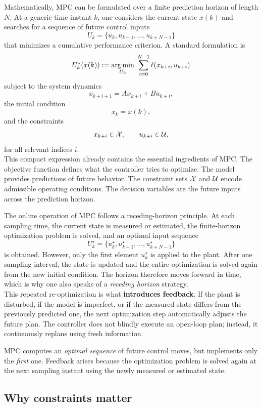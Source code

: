 Mathematically, MPC can be formulated over a finite prediction horizon of length $N$. At a generic time instant $k$, one considers the current state $x(k)$ and searches for a sequence of future control inputs
\[
U_k = \{u_k,u_{k+1},\dots,u_{k+N-1}\}
\]
that minimizes a cumulative performance criterion. A standard formulation is
\[
U_k^\star(x(k)) := \operatorname*{arg\,min}_{U_k}\; \sum_{i=0}^{N-1} \ell(x_{k+i},u_{k+i})
\]
subject to the system dynamics
\[
x_{k+i+1}=Ax_{k+i}+Bu_{k+i},
\]
the initial condition
\[
x_k = x(k),
\]
and the constraints
\[
x_{k+i}\in\mathcal{X},\qquad u_{k+i}\in\mathcal{U},
\]
for all relevant indices $i$.\\
This compact expression already contains the essential ingredients of MPC. The objective function defines what the controller tries to optimize. The model provides predictions of future behavior. The constraint sets $\mathcal{X}$ and $\mathcal{U}$ encode admissible operating conditions. The decision variables are the future inputs across the prediction horizon.

The online operation of MPC follows a receding-horizon principle. At each sampling time, the current state is measured or estimated, the finite-horizon optimization problem is solved, and an optimal input sequence
\[
U_k^\star = \{u_k^\star,u_{k+1}^\star,\dots,u_{k+N-1}^\star\}
\]
is obtained. However, only the first element $u_k^\star$ is applied to the plant. After one sampling interval, the state is updated and the entire optimization is solved again from the new initial condition. The horizon therefore moves forward in time, which is why one also speaks of a \emph{receding horizon} strategy.\\
This repeated re-optimization is what \textbf{introduces feedback}. If the plant is disturbed, if the model is imperfect, or if the measured state differs from the previously predicted one, the next optimization step automatically adjusts the future plan. The controller does not blindly execute an open-loop plan; instead, it continuously replans using fresh information.

\begin{theorembox}
MPC computes an \emph{optimal sequence} of future control moves, but implements only the \emph{first} one. Feedback arises because the optimization problem is solved again at the next sampling instant using the newly measured or estimated state.
\end{theorembox}

\subsection{Why constraints matter}

